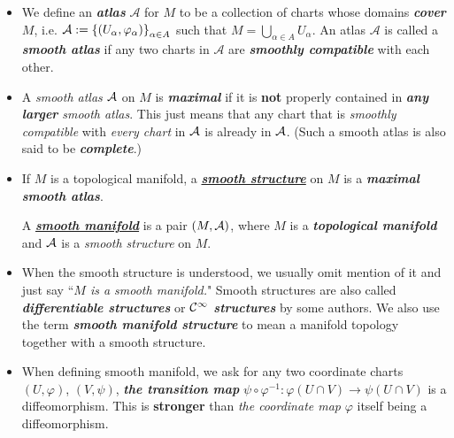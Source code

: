\documentclass[11pt]{article}
\begin{document}
\begin{itemize}
\item \begin{definition}
We define an \emph{\textbf{atlas}} $\mathcal{A}$ for $M$ to be a collection of charts whose domains \emph{\textbf{cover}} $M$, i.e. $\mathcal{A} := \left\{(U_{\alpha}, \varphi_{\alpha})\right\}_{\alpha \in A}$ such that  $M = \bigcup_{\alpha \in A}U_{\alpha}$.  An atlas $\mathcal{A}$ is called a \emph{\textbf{smooth atlas}} if any two charts in $\mathcal{A}$ are \emph{\textbf{smoothly compatible}} with each other.
\end{definition}

\item \begin{definition}
A \emph{smooth atlas} ${\mathcal A}$ on $M$ is \emph{\textbf{maximal}} if it is \textbf{not} properly contained in \emph{\textbf{any larger} smooth atlas}. This just means that any chart that is \emph{smoothly compatible} with \emph{every chart} in ${\mathcal A}$ is already in ${\mathcal A}$. (Such a smooth atlas is also said to be \emph{\textbf{complete}}.)
\end{definition}

\item 
\begin{definition}
If $M$ is a topological manifold, a \underline{\emph{\textbf{smooth structure}}} on $M$ is a \emph{\textbf{maximal smooth atlas}}. 

A \underline{\emph{\textbf{smooth manifold}}} is a pair $(M, {\mathcal A})$, where $M$ is a \emph{\textbf{topological manifold}} and ${\mathcal A}$ is a \emph{smooth structure} on $M$.
\end{definition}

\item \begin{remark}
When the smooth structure is understood, we usually omit mention of it and just say ``\emph{$M$ is a smooth manifold.}" Smooth structures are also called \emph{\textbf{differentiable structures}} or \textbf{\emph{${\mathcal C}^{\infty}$ structures}} by some authors. We also use the term \emph{\textbf{smooth manifold structure}} to mean a manifold topology together with a smooth structure.
\end{remark}

\item \begin{remark}
When defining smooth manifold, we ask for any two coordinate charts $(U, \varphi)$, $(V, \psi)$, \emph{\textbf{the transition map}} $\psi \circ \varphi^{-1}: \varphi(U \cap V ) \rightarrow \psi(U \cap V)$ is a diffeomorphism. This is \textbf{stronger} than \emph{the coordinate map} $\varphi$ itself being a  diffeomorphism.
\end{remark}



\end{itemize}
\end{document}
